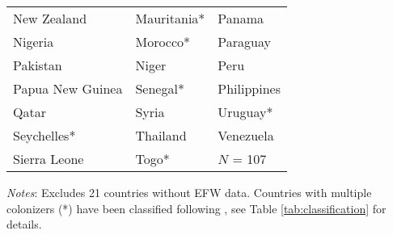 \begin{table}[h!]
\begin{threeparttable}
\begin{tabular*}{\textwidth}{@{\extracolsep{\fill}}lll@{\extracolsep{\fill}}}
                     New Zealand 	&	                      Mauritania* 	&	                          Panama 	\\
                         Nigeria 	&	                         Morocco* 	&	                        Paraguay 	\\
                        Pakistan 	&	                           Niger 	&	                            Peru 	\\
                Papua New Guinea 	&	                         Senegal* 	&	                     Philippines 	\\
                           Qatar 	&	                           Syria 	&	                         Uruguay* 	\\
                      Seychelles* 	&	                        Thailand 	&	                       Venezuela 	\\
                    Sierra Leone 	&	                            Togo* 	&	                       $N$ = 107	\\
\hline
\hline
\end{tabular*}
\begin{tablenotes}
\small
\item \textit{Notes}:  Excludes 21 countries without EFW data. Countries with multiple colonizers (*) have been classified following \cite{laporta1999quality}, see Table \ref{tab:classification} for details. 
\end{tablenotes}
\end{threeparttable}
\end{table}